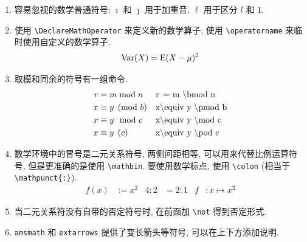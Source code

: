\documentclass[UTF8,no-math]{ctexart}
\numberwithin{enumi}{section}
\begin{document}
\begin{enumerate}
\begin{table}[htb]
\begin{tabular}{lll}
                花体 (\verb|mathrsfs|) & \verb|\mathscr| &$\mathscr{ABCHIJXYZabchijxyz12345}$\\
                \bottomrule
            \end{tabular}
        \end{table}\par
        \emph{空集 $\varnothing$ 的基数是 $0$, 自然数集 $\mathbb{N}=\{1,2,3,\ldots\}$ 的基数是 $\aleph_0$, 则实数集 $\mathbb{R}$ 的基数 $\#\mathbb{R}=\aleph_1=2^{\aleph_0}$. }
        \item 容易忽视的数学普通符号: $\imath$ 和 $\jmath$ 用于加重音, $\ell$ 用于区分 $l$ 和 $1$.
        \item {}使用 \verb|\DeclareMathOperator| 来定义新的数学算子, 使用 \verb|\operatorname| 来临时使用自定义的数学算子. \begin{equation}
        \operatorname{Var}(X)=\operatorname{E}(X-\mu)^2
        \end{equation}
        \item 取模和同余的符号有一组命令.
        \begin{align}
        r&=m\bmod n &  &\text{\lstinline|r = m \\bmod n|} \notag\\
        x&\equiv y \pmod b & &\text{\lstinline|x\\equiv y \\pmod b|}\notag\\
        x&\equiv y \mod c & &\text{\lstinline|x\\equiv y \\mod c|}\notag\\
        x&\equiv y \pod c & &\text{\lstinline|x\\equiv y \\pod c|}
        \end{align}
        \item 数学环境中的冒号是二元关系符号, 两侧间距相等, 可以用来代替比例运算符号, 但是更准确的是使用 \verb|\mathbin|. 要使用数学标点, 使用 \verb|\colon| (相当于 \verb|\mathpunct{:}|).
        \begin{align}
        f(x)&:=x^2 & 4\mathbin{:}2&=2\mathbin{:}1 & f&\colon x\mapsto x^2
        \end{align}
        \item 当二元关系符没有自带的否定符号时, 在前面加 \verb|\not| 得到否定形式. 
        \item \texttt{amsmath} 和 \texttt{extarrows} 提供了变长箭头等符号, 可以在上下方添加说明.

\end{enumerate}
\end{document}
